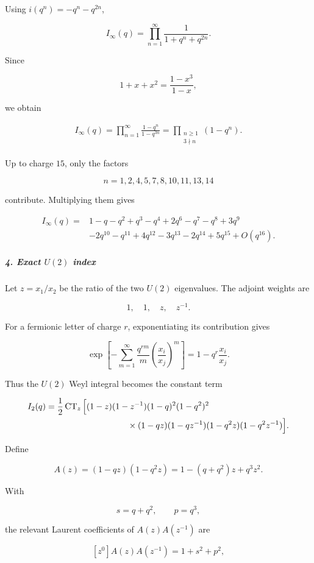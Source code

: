 Using $i(q^n)=-q^n-q^{2n}$,

\[
I_\infty(q) = \prod_{n=1}^{\infty} \frac{1}{1+q^n+q^{2n}}.
\]

Since

\[
1+x+x^2=\frac{1-x^3}{1-x},
\]

we obtain

\[
\begin{aligned}
I_\infty(q)
=
\prod_{n=1}^{\infty}
\frac{1-q^n}{1-q^{3n}}
=
\prod_{\substack{n\geq1\\3\nmid n}}(1-q^n).
\end{aligned}
\]

Up to charge $15$, only the factors

\[
n=1,2,4,5,7,8,10,11,13,14
\]

contribute. Multiplying them gives

\[
\begin{aligned}
I_\infty(q)
={}&1-q-q^2+q^3-q^4+2q^6-q^7-q^8+3q^9\\
&-2q^{10}-q^{11}+4q^{12}-3q^{13}-2q^{14}
+5q^{15}+O(q^{16}).
\end{aligned}
\]

\subparagraph*{4. Exact $U(2)$ index}

Let $z=x_1/x_2$ be the ratio of the two $U(2)$ eigenvalues. The adjoint weights are

\[
1,\quad 1,\quad z,\quad z^{-1}.
\]

For a fermionic letter of charge $r$, exponentiating its contribution gives

\[
\exp\left[ -\sum_{m=1}^{\infty} \frac{q^{rm}}{m}\left(\frac{x_i}{x_j}\right)^m \right] = 1-q^r\frac{x_i}{x_j}.
\]

Thus the $U(2)$ Weyl integral becomes the constant term

\[
\begin{aligned}
I_2(q)
={}&\frac12\operatorname{CT}_{z}\Big[
(1-z)(1-z^{-1})(1-q)^2(1-q^2)^2\\
&\hspace{29mm}\times
(1-qz)(1-qz^{-1})
(1-q^2z)(1-q^2z^{-1})
\Big].
\end{aligned}
\]

Define

\[
A(z)=(1-qz)(1-q^2z) =1-(q+q^2)z+q^3z^2.
\]

With

\[
s=q+q^2,\qquad p=q^3,
\]

the relevant Laurent coefficients of $A(z)A(z^{-1})$ are

\[
[z^0]A(z)A(z^{-1})=1+s^2+p^2,
\]


